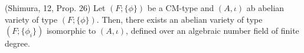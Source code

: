 \documentclass[12pt]{article}
\begin{document}
\begin{theorem}(Shimura, 12, Prop. 26)
    Let $(F; \{\phi\})$ be a CM-type and $(A, \iota)$ ab abelian variety of type $(F; \{\phi\})$. Then, there exists an abelian variety of type $(F; \{\phi_i\})$ isomorphic to $(A, \iota)$, defined over an algebraic number field of finite degree.
\end{theorem}







\end{document}
